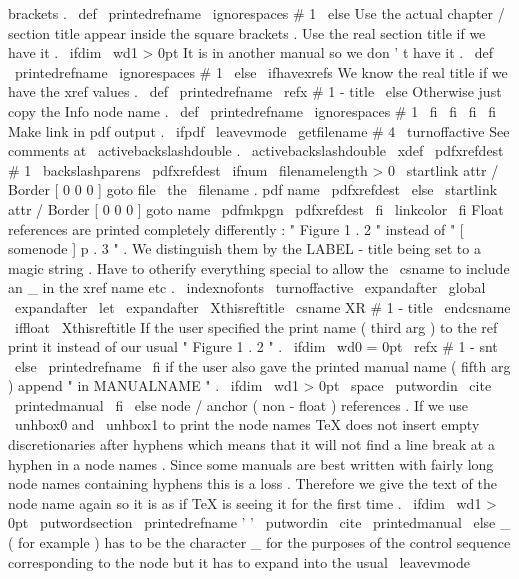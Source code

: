 {{brackets
.
\
def
\
printedrefname
{
\
ignorespaces
#
1
}
%
\
else
%
Use
the
actual
chapter
/
section
title
appear
inside
%
the
square
brackets
.
Use
the
real
section
title
if
we
have
it
.
\
ifdim
\
wd1
>
0pt
%
It
is
in
another
manual
so
we
don
'
t
have
it
.
\
def
\
printedrefname
{
\
ignorespaces
#
1
}
%
\
else
\
ifhavexrefs
%
We
know
the
real
title
if
we
have
the
xref
values
.
\
def
\
printedrefname
{
\
refx
{
#
1
-
title
}
{
}
}
%
\
else
%
Otherwise
just
copy
the
Info
node
name
.
\
def
\
printedrefname
{
\
ignorespaces
#
1
}
%
\
fi
%
\
fi
\
fi
\
fi
%
%
Make
link
in
pdf
output
.
\
ifpdf
\
leavevmode
\
getfilename
{
#
4
}
%
{
\
turnoffactive
%
See
comments
at
\
activebackslashdouble
.
{
\
activebackslashdouble
\
xdef
\
pdfxrefdest
{
#
1
}
%
\
backslashparens
\
pdfxrefdest
}
%
%
\
ifnum
\
filenamelength
>
0
\
startlink
attr
{
/
Border
[
0
0
0
]
}
%
goto
file
{
\
the
\
filename
.
pdf
}
name
{
\
pdfxrefdest
}
%
\
else
\
startlink
attr
{
/
Border
[
0
0
0
]
}
%
goto
name
{
\
pdfmkpgn
{
\
pdfxrefdest
}
}
%
\
fi
}
%
\
linkcolor
\
fi
%
%
Float
references
are
printed
completely
differently
:
"
Figure
1
.
2
"
%
instead
of
"
[
somenode
]
p
.
3
"
.
We
distinguish
them
by
the
%
LABEL
-
title
being
set
to
a
magic
string
.
{
%
%
Have
to
otherify
everything
special
to
allow
the
\
csname
to
%
include
an
_
in
the
xref
name
etc
.
\
indexnofonts
\
turnoffactive
\
expandafter
\
global
\
expandafter
\
let
\
expandafter
\
Xthisreftitle
\
csname
XR
#
1
-
title
\
endcsname
}
%
\
iffloat
\
Xthisreftitle
%
If
the
user
specified
the
print
name
(
third
arg
)
to
the
ref
%
print
it
instead
of
our
usual
"
Figure
1
.
2
"
.
\
ifdim
\
wd0
=
0pt
\
refx
{
#
1
-
snt
}
%
\
else
\
printedrefname
\
fi
%
%
if
the
user
also
gave
the
printed
manual
name
(
fifth
arg
)
append
%
"
in
MANUALNAME
"
.
\
ifdim
\
wd1
>
0pt
\
space
\
putwordin
{
}
\
cite
{
\
printedmanual
}
%
\
fi
\
else
%
node
/
anchor
(
non
-
float
)
references
.
%
%
If
we
use
\
unhbox0
and
\
unhbox1
to
print
the
node
names
TeX
does
not
%
insert
empty
discretionaries
after
hyphens
which
means
that
it
will
%
not
find
a
line
break
at
a
hyphen
in
a
node
names
.
Since
some
manuals
%
are
best
written
with
fairly
long
node
names
containing
hyphens
this
%
is
a
loss
.
Therefore
we
give
the
text
of
the
node
name
again
so
it
%
is
as
if
TeX
is
seeing
it
for
the
first
time
.
\
ifdim
\
wd1
>
0pt
\
putwordsection
{
}
\
printedrefname
'
'
\
putwordin
{
}
\
cite
{
\
printedmanual
}
%
\
else
%
_
(
for
example
)
has
to
be
the
character
_
for
the
purposes
of
the
%
control
sequence
corresponding
to
the
node
but
it
has
to
expand
%
into
the
usual
\
leavevmode
}}
